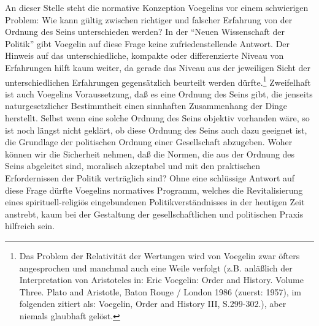An dieser Stelle steht die normative Konzeption Voegelins vor einem
schwierigen Problem: Wie kann gültig zwischen richtiger und falscher Erfahrung
von der Ordnung des Seins unterschieden werden? In der "`Neuen Wissenschaft
der Politik"' gibt Voegelin auf diese Frage keine zufriedenstellende Antwort.
Der Hinweis auf das unterschiedliche, kompakte oder differenzierte Niveau von
Erfahrungen hilft kaum weiter, da gerade das Niveau aus der jeweiligen Sicht
der unterschiedlichen Erfahrungen gegensätzlich beurteilt werden
dürfte.\footnote{Das Problem der Relativität der Wertungen wird von Voegelin
  zwar öfters angesprochen und manchmal auch eine Weile verfolgt (z.B.
  anläßlich der Interpretation von Aristoteles in: Eric Voegelin: Order and
  History. Volume Three. Plato and Aristotle, Baton Rouge / London 1986
  (zuerst: 1957), im folgenden zitiert als: Voegelin, Order and History III,
  S.299-302.), aber niemals glaubhaft gelöst.}  Zweifelhaft ist auch Voegelins
Voraussetzung, daß es eine Ordnung des Seins gibt, die jenseits
naturgesetzlicher Bestimmtheit einen sinnhaften Zusammenhang der Dinge
herstellt. Selbst wenn eine solche Ordnung des Seins objektiv vorhanden wäre,
so ist noch längst nicht geklärt, ob diese Ordnung des Seins auch dazu
geeignet ist, die Grundlage der politischen Ordnung einer Gesellschaft
abzugeben. Woher können wir die Sicherheit nehmen, daß die Normen, die aus der
Ordnung des Seins abgeleitet sind, moralisch akzeptabel und mit den
praktischen Erfordernissen der Politik verträglich sind? Ohne eine schlüssige
Antwort auf diese Frage dürfte Voegelins normatives Programm, welches die
Revitalisierung eines spirituell-religiös eingebundenen Politikverständnisses
in der heutigen Zeit anstrebt, kaum bei der Gestaltung der gesellschaftlichen
und politischen Praxis hilfreich sein.

